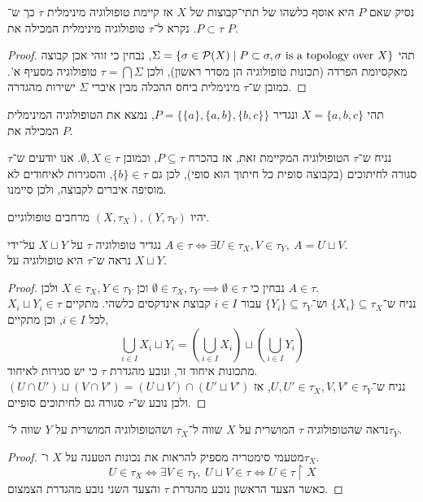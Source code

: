 \subquestion{}
נסיק שאם $P$ היא אוסף כלשהו של תתי־קבוצות של $X$ אז קיימת טופולוגיה מינימלית $\tau$ כך ש־$P \subset \tau$.
נקרא ל־$\tau$ טופולוגיה מינימלית המכילה את $P$.
\begin{proof}
	תהי $\Sigma = \{ \sigma \in \mathcal{P}(X) \mid P \subset \sigma, \sigma \text{ is a topology over } X \}$, נבחין כי זוהי אכן קבוצה מאקסיומת הפרדה (תכונות טופולוגיה הן מסדר ראשון), ולכן $\tau = \bigcap \Sigma$ טופולוגיה מסעיף א'.
	כמובן ש־$\tau$ מינימלית ביחס ההכלה מבין איברי $\Sigma$ ישירות מהגדרה.
\end{proof}

\subquestion{}
תהי $X = \{a, b, c\}$ ונגדיר $P = \{\{a\}, \{a, b\}, \{b, c\}\}$, נמצא את הטופולוגיה המינימלית המכילה את $P$.
\begin{solution}
	נניח ש־$\tau$ הטופולוגיה המקיימת זאת, אז בהכרח $P \subseteq \tau$, וכמובן $\emptyset, X \in \tau$.
	אנו יודעים ש־$\tau$ סגורה לחיתוכים (בקבוצה סופית כל חיתוך הוא סופי), לכן גם $\{b\} \in \tau$, והסגירות לאיחודים לא מוסיפה איברים לקבוצה, ולכן סיימנו.
\end{solution}

\question{}
יהיו $(X, \tau_X), (Y, \tau_Y)$ מרחבים טופולוגיים.

\subquestion{}
נגדיר טופולוגיה $\tau$ על $X \sqcup Y$ על־ידי $A \in \tau \iff \exists U \in \tau_X, V \in \tau_Y,\ A = U \sqcup V$. \\
נראה ש־$\tau$ היא טופולוגיה על $X \sqcup Y$.
\begin{proof}
	נבחין כי $\emptyset \in \tau_X, \tau_Y \implies \emptyset \in \tau$ וכן $X \in \tau_X, Y \in \tau_Y$ ולכן $A \in \tau$. \\
	נניח ש־$\{ X_i \} \subseteq \tau_X$ וש־$\{ Y_i \} \subseteq \tau_Y$ עבור $i \in I$ קבוצת אינדקסים כלשהי.
	מתקיים $X_i \sqcup Y_i \in \tau$ לכל $i \in I$, וכן מתקיים,
	\[
		\bigcup_{i \in I} X_i \sqcup Y_i
		= \left(\bigcup_{i \in I} X_i\right) \sqcup \left(\bigcup_{i \in I} Y_i\right)
	\]
	מתכונות איחוד זר, ונובע מהגדרת $\tau$ כי יש סגירות לאיחוד. \\
	נניח ש־$U, U' \in \tau_X, V, V' \in \tau_Y$, אז $(U \cap U') \sqcup (V \cap V') = (U \sqcup V) \cap (U' \sqcup V')$ ולכן נובע ש־$\tau$ סגורה גם לחיתוכים סופיים.
\end{proof}

\subquestion{}
נראה שהטופולוגיה $\tau$ המושרית על $X$ שווה ל־$\tau_X$ ושהטופולוגיה המושרית על $Y$ שווה ל־$\tau_Y$.
\begin{proof}
	מטעמי סימטריה מספיק להראות את נכונות הטענה על $X$ ו־$\tau_X$.
	\[
		U \in \tau_X
		\iff \exists V \in \tau_Y,\ U \sqcup V \in \tau
		\iff U \in \tau \restriction X
	\]
	כאשר הצעד הראשון נובע מהגדרת $\tau$ והצעד השני נובע מהגדרת הצמצום.
\end{proof}

